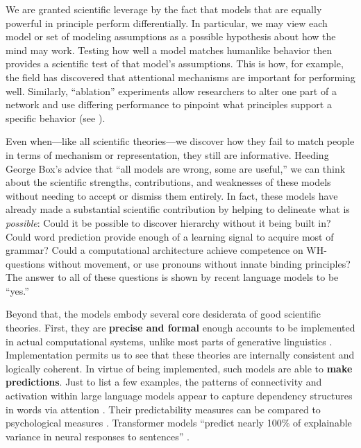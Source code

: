 \documentclass[output=paper,colorlinks,citecolor=brown
]{langscibook}
\begin{document}
We are granted scientific leverage by the fact that models that are equally powerful in principle perform differentially. In particular, we may view each model or set of modeling assumptions as a possible hypothesis about how the mind may work. Testing how well a model matches humanlike behavior then provides a scientific test of that model's assumptions. This is how, for example, the field has discovered that attentional mechanisms are important for performing well.  Similarly, ``ablation'' experiments allow researchers to alter one part of a network and use differing performance to pinpoint what principles support a specific behavior (see \cite{warstadt2022artificial}). 

Even when---like all scientific theories---we discover how they fail to match people in terms of mechanism or representation, they still are informative. Heeding George Box's advice that ``all models are wrong, some are useful,'' we can think about the scientific strengths, contributions, and weaknesses of these models without needing to accept or dismiss them entirely. In fact, these models have already made a substantial scientific contribution by helping to delineate what is \emph{possible}: Could it be possible to discover hierarchy without it being built in? Could word prediction provide enough of a learning signal to acquire most of grammar? Could a computational architecture achieve competence on WH-questions without movement, or use pronouns without innate binding principles? The answer to all of these questions is shown by recent language models to be ``yes.'' 

Beyond that, the models embody several core desiderata of good scientific theories. First, they are
\textbf{precise and formal} enough accounts to be implemented in actual computational systems, unlike most parts of generative linguistics \citep{pullum1989formal}. Implementation permits us to see that these theories are internally consistent and logically coherent. In virtue of being implemented, such models are able to \textbf{make predictions}. Just to list a few examples, the patterns of connectivity and activation within large language models appear to capture dependency structures in words via attention \citep{manning2020emergent}. Their predictability measures can be compared to psychological measures \citep{hoover2022plausibility,shain2022large}. Transformer models ``predict nearly 100\% of explainable variance in neural responses to sentences'' \citep{schrimpf2021neural}. 
\end{document}
